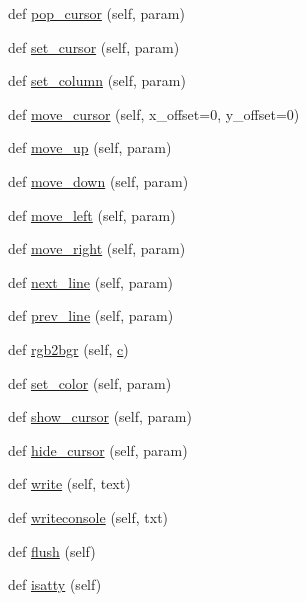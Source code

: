 \begin{DoxyCompactItemize}
\item 
def \hyperlink{classwaflib_1_1ansiterm_1_1_ansi_term_a2093c2f7ded18188b0bf2989a0083a18}{pop\+\_\+cursor} (self, param)
\item 
def \hyperlink{classwaflib_1_1ansiterm_1_1_ansi_term_aba842837a7fe351aa8459aa375249c69}{set\+\_\+cursor} (self, param)
\item 
def \hyperlink{classwaflib_1_1ansiterm_1_1_ansi_term_acd65956a7d56681cc669acca5bdd43fb}{set\+\_\+column} (self, param)
\item 
def \hyperlink{classwaflib_1_1ansiterm_1_1_ansi_term_ade95c6eb1c7ed7928780aad4e6b4e268}{move\+\_\+cursor} (self, x\+\_\+offset=0, y\+\_\+offset=0)
\item 
def \hyperlink{classwaflib_1_1ansiterm_1_1_ansi_term_a7725bd9ed185458669ad7601fb7ff9d9}{move\+\_\+up} (self, param)
\item 
def \hyperlink{classwaflib_1_1ansiterm_1_1_ansi_term_a7b2ea0403457b7cd8d0ac4088064d812}{move\+\_\+down} (self, param)
\item 
def \hyperlink{classwaflib_1_1ansiterm_1_1_ansi_term_a617dda0ced0a3e3f3443366d4a1c46bb}{move\+\_\+left} (self, param)
\item 
def \hyperlink{classwaflib_1_1ansiterm_1_1_ansi_term_a1388984c5cb5051d6c48682d1cd998b7}{move\+\_\+right} (self, param)
\item 
def \hyperlink{classwaflib_1_1ansiterm_1_1_ansi_term_a8ce79cf478dc1bf0cec2c12e28103522}{next\+\_\+line} (self, param)
\item 
def \hyperlink{classwaflib_1_1ansiterm_1_1_ansi_term_ac65f3453904e9c561f530b7c43e73f12}{prev\+\_\+line} (self, param)
\item 
def \hyperlink{classwaflib_1_1ansiterm_1_1_ansi_term_ad097d16ecb1babcef5970faccad1e7e9}{rgb2bgr} (self, \hyperlink{rfft2d_test_m_l_8m_ae0323a9039add2978bf5b49550572c7c}{c})
\item 
def \hyperlink{classwaflib_1_1ansiterm_1_1_ansi_term_a2b56ee3c8294f7e2e5bca7cc60e8ee05}{set\+\_\+color} (self, param)
\item 
def \hyperlink{classwaflib_1_1ansiterm_1_1_ansi_term_a594f6cf62d5e4ca33f2b88127fd6393d}{show\+\_\+cursor} (self, param)
\item 
def \hyperlink{classwaflib_1_1ansiterm_1_1_ansi_term_a2ca4bde33edd4afa92c8bda3f01d1dc9}{hide\+\_\+cursor} (self, param)
\item 
def \hyperlink{classwaflib_1_1ansiterm_1_1_ansi_term_a03ecdf1c9e54a69800aae320175c281b}{write} (self, text)
\item 
def \hyperlink{classwaflib_1_1ansiterm_1_1_ansi_term_a8296f875a3fd0a03fc109073f2a73a3e}{writeconsole} (self, txt)
\item 
def \hyperlink{classwaflib_1_1ansiterm_1_1_ansi_term_a08667242c11cdfd8b74d64f8191d4938}{flush} (self)
\item 
def \hyperlink{classwaflib_1_1ansiterm_1_1_ansi_term_a08e698612e76adc1aa3e26cdc5cb2009}{isatty} (self)
\end{DoxyCompactItemize}
